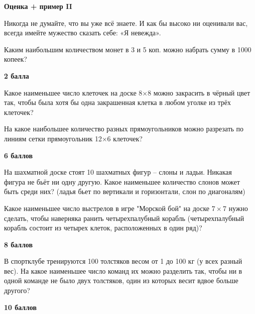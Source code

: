 \centerline{\bf \Huge Оценка + пример II}

\begin{flushright}
        \scriptsize{Никогда не думайте, что вы уже всё знаете. И как бы высоко ни оценивали вас, всегда имейте мужество сказать себе: «Я невежда».}
\end{flushright}

 Каким наибольшим количеством монет в 3 и 5 коп. можно набрать сумму в 1000 копеек?

\begin{flushright} \textbf{2 балла}\\ 
\end{flushright}

 Какое наименьшее число клеточек на доске 8×8 можно закрасить в чёрный цвет так, чтобы была хотя бы одна закрашенная клетка в любом уголке из трёх клеточек?

 На какое наибольшее количество разных прямоугольников можно разрезать по линиям сетки прямоугольник 12×6 клеточек?

\begin{flushright} \textbf{6 баллов}\\ 
\end{flushright}

 На шахматной доске стоят 10 шахматных фигур – слоны и ладьи. Никакая фигура не бьёт ни одну другую. Какое наименьшее количество слонов может быть среди них? (ладья бьет по вертикали и горизонтали, слон по диагоналям)

 Какое наименьшее число выстрелов в игре "Морской бой" на доске $7\times7$ нужно сделать, чтобы наверняка ранить четырехпалубный корабль (четырехпалубный корабль состоит из четырех клеток, расположенных в один ряд)?

\begin{flushright} \textbf{8 баллов}\\ 
\end{flushright}

 В спортклубе тренируются 100 толстяков весом от 1 до 100 кг (у всех разный вес). На какое наименьшее число команд их можно разделить так, чтобы ни в одной команде не было двух толстяков, один из которых весит вдвое больше другого?

\begin{flushright} \textbf{10 баллов}\\ 
\end{flushright}
